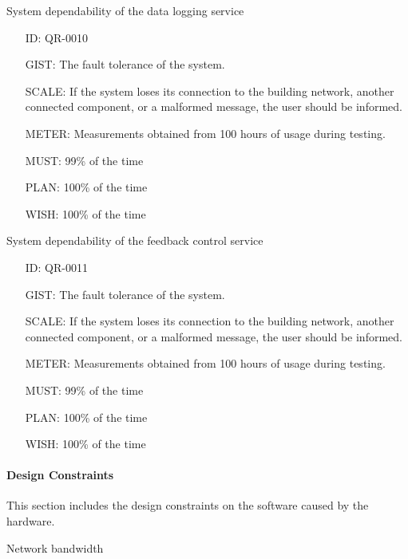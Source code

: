         System dependability of the data logging service

        \begin{itemize}
          \setlength{\itemindent}{.5in}
          \itemsep .15em
          \item[ID:] QR-0010
          \item[GIST:] The fault tolerance of the system.
          \item[SCALE:] If the system loses its connection to the building
            network, another connected component, or a malformed message, the
            user should be informed.
          \item[METER:] Measurements obtained from 100 hours of usage during
            testing.
          \item[MUST:] 99\% of the time
          \item[PLAN:] 100\% of the time
          \item[WISH:] 100\% of the time
        \end{itemize}

        System dependability of the feedback control service

        \begin{itemize}
          \setlength{\itemindent}{.5in}
          \itemsep .15em
          \item[ID:] QR-0011
          \item[GIST:] The fault tolerance of the system.
          \item[SCALE:] If the system loses its connection to the building
            network, another connected component, or a malformed message, the
            user should be informed.
          \item[METER:] Measurements obtained from 100 hours of usage during
            testing.
          \item[MUST:] 99\% of the time
          \item[PLAN:] 100\% of the time
          \item[WISH:] 100\% of the time
        \end{itemize}

      \paragraph{Design Constraints}

        This section includes the design constraints on the software caused by
        the hardware.

        Network bandwidth

